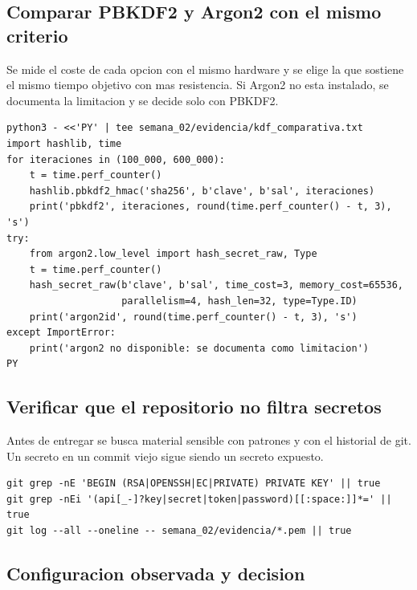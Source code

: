 \documentclass[11pt,a4paper]{article}
\begin{document}
\subsection{Comparar PBKDF2 y Argon2 con el mismo criterio}

Se mide el coste de cada opcion con el mismo hardware y se elige la que sostiene el mismo tiempo objetivo con mas resistencia. Si Argon2 no esta instalado, se documenta la limitacion y se decide solo con PBKDF2.

\begin{lstlisting}[style=estiloCodigo]
python3 - <<'PY' | tee semana_02/evidencia/kdf_comparativa.txt
import hashlib, time
for iteraciones in (100_000, 600_000):
    t = time.perf_counter()
    hashlib.pbkdf2_hmac('sha256', b'clave', b'sal', iteraciones)
    print('pbkdf2', iteraciones, round(time.perf_counter() - t, 3), 's')
try:
    from argon2.low_level import hash_secret_raw, Type
    t = time.perf_counter()
    hash_secret_raw(b'clave', b'sal', time_cost=3, memory_cost=65536,
                    parallelism=4, hash_len=32, type=Type.ID)
    print('argon2id', round(time.perf_counter() - t, 3), 's')
except ImportError:
    print('argon2 no disponible: se documenta como limitacion')
PY
\end{lstlisting}

\subsection{Verificar que el repositorio no filtra secretos}

Antes de entregar se busca material sensible con patrones y con el historial de git. Un secreto en un commit viejo sigue siendo un secreto expuesto.

\begin{lstlisting}[style=estiloCodigo]
git grep -nE 'BEGIN (RSA|OPENSSH|EC|PRIVATE) PRIVATE KEY' || true
git grep -nEi '(api[_-]?key|secret|token|password)[[:space:]]*=' || true
git log --all --oneline -- semana_02/evidencia/*.pem || true
\end{lstlisting}

\subsection{Configuracion observada y decision}
\end{document}
